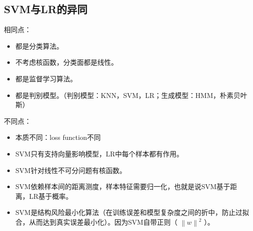 \documentclass[letterpaper,10pt,english]{sphinxmanual}
\begin{document}
\subsection{SVM与LR的异同}
\label{\detokenize{machineLearning/02_svm:svmlr}}
相同点：
\begin{itemize}
\item {} 
都是分类算法。

\item {} 
不考虑核函数，分类面都是线性。

\item {} 
都是监督学习算法。

\item {} 
都是判别模型。（判别模型：KNN，SVM，LR；生成模型：HMM，朴素贝叶斯）

\end{itemize}

不同点：
\begin{itemize}
\item {} 
本质不同：loss function不同

\item {} 
SVM只有支持向量影响模型，LR中每个样本都有作用。

\item {} 
SVM针对线性不可分问题有核函数。

\item {} 
SVM依赖样本间的距离测度，样本特征需要归一化，也就是说SVM基于距离，LR基于概率。

\item {} 
SVM是结构风险最小化算法（在训练误差和模型复杂度之间的折中，防止过拟合，从而达到真实误差最小化）。因为SVM自带正则（ \(\left \| w \right \|^2\) ）。

\end{itemize}
\end{document}
